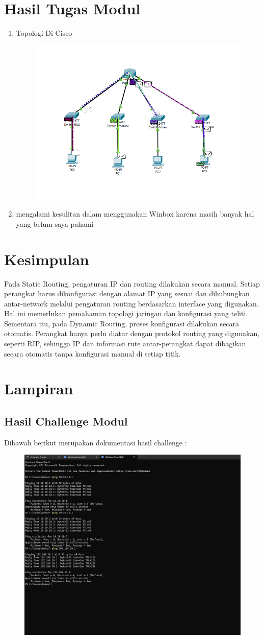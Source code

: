 \section{Hasil Tugas Modul}
\begin{enumerate}
    \item Topologi Di Cisco
    \begin{figure}[H]
        \centering
        \includegraphics[width=0.5\linewidth]{cisco.png}
    \end{figure}
    \item mengalami kesulitan dalam menggunakan Winbox karena masih banyak hal yang belum saya pahami 
\end{enumerate}

\section{Kesimpulan}
Pada Static Routing, pengaturan IP dan routing dilakukan secara manual. Setiap perangkat harus dikonfigurasi dengan alamat IP yang sesuai dan dihubungkan antar-network melalui pengaturan routing berdasarkan interface yang digunakan. Hal ini memerlukan pemahaman topologi jaringan dan konfigurasi yang teliti. Sementara itu, pada Dynamic Routing, proses konfigurasi dilakukan secara otomatis. Perangkat hanya perlu diatur dengan protokol routing yang digunakan, seperti RIP, sehingga IP dan informasi rute antar-perangkat dapat dibagikan secara otomatis tanpa konfigurasi manual di setiap titik.
\section{Lampiran}
\subsection{Hasil Challenge Modul}
Dibawah berikut merupakan dokumentasi hasil challenge :
\begin{figure}[H]
    \centering
    \includegraphics[width=0.5\linewidth]{Screenshot 2025-05-10 164954.png}
\end{figure}
